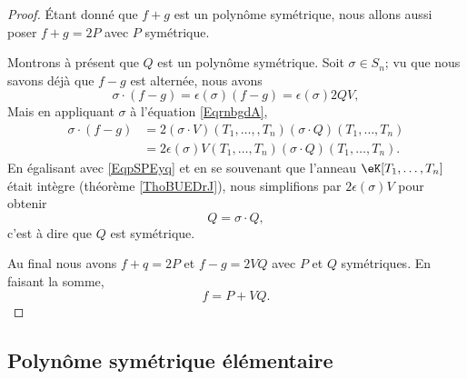 \begin{proof}
    Étant donné que \( f+g\) est un polynôme symétrique, nous allons aussi poser \( f+g=2P\) avec \( P\) symétrique.

    Montrons à présent que \( Q\) est un polynôme symétrique. Soit \( \sigma\in S_n\); vu que nous savons déjà que \( f-g\) est alternée, nous avons
    \begin{equation}    \label{EqpSPEyq}
        \sigma\cdot (f-g)=\epsilon(\sigma)(f-g)=\epsilon(\sigma)2QV,
    \end{equation}
    Mais en appliquant \( \sigma\) à l'équation \eqref{EqrnbgdA},
    \begin{subequations}
        \begin{align}
            \sigma\cdot (f-g)&=2(\sigma\cdot V)(T_1,\ldots, ,T_n)(\sigma\cdot Q)(T_1,\ldots,T_n)\\
            &=2\epsilon(\sigma)V(T_1,\ldots, T_n)(\sigma\cdot Q)(T_1,\ldots, T_n).
        \end{align}
    \end{subequations}
    En égalisant avec \eqref{EqpSPEyq} et en se souvenant que l'anneau \( \eK[T_1,\ldots, T_n]\) était intègre (théorème \ref{ThoBUEDrJ}), nous simplifions par \( 2\epsilon(\sigma)V\) pour obtenir
    \begin{equation}
        Q=\sigma\cdot Q,
    \end{equation}
    c'est à dire que \( Q\) est symétrique.

    Au final nous avons \( f+q=2P\) et \( f-g=2VQ\) avec \( P\) et \( Q\) symétriques. En faisant la somme,
    \begin{equation}
        f=P+VQ.
    \end{equation}
\end{proof}

\subsection{Polynôme symétrique élémentaire}

